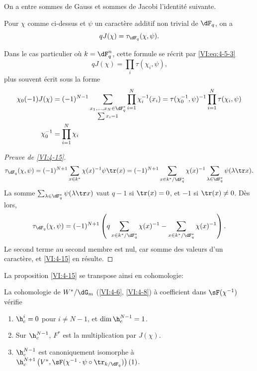 On a entre sommes de Gauss et sommes de Jacobi l'identité suivante. 





\begin{proposition_}\label{VI:4-15}
Pour $\chi$ comme ci-dessus et $\psi$ un caractère additif non trivial de 
$\dF_q$, on a 
\[
  q J(\chi) = \tau_{\dF_q}(\chi,\psi) \text{.} 
\]
\end{proposition_}

Dans le cas particulier où $k=\dF_q^n$, cette formule se récrit par 
\eqref{VI:eq:4-5-3} 
\begin{equation*}\tag{4.15.1}\label{VI:eq:4-15-1}
  q J(\chi) = \prod_i \tau(\chi_i,\psi) \text{,} 
\end{equation*}
plus souvent écrit sous la forme 
\begin{align*}
  \chi_0(-1) J(\chi) &= (-1)^{N-1} \sum_{\substack{x_1,\dots,x_N\in \dF_q^\ast \\ \sum x_i = 1}} \prod_{i=1}^N \chi_i^{-1}(x_i) = \tau(\chi_0^{-1},\psi)^{-1} \prod_{i=1}^N \tau(\chi_i,\psi) \\
  \chi_0^{-1} &= \prod_{i=1}^N \chi_i 
\end{align*}





\begin{proof}[Preuve de \ref{VI:4-15}]
\[
  \tau_{\dF_q}(\chi,\psi) = (-1)^{N+1} \sum_{x\in k^\ast} \chi(x)^{-1} \psi \tr(x) = (-1)^{N+1} \sum_{x\in k^\ast/\dF_q^\ast} \chi(x)^{-1} \sum_{\lambda\in \dF_q^\ast} \psi(\lambda \tr x) \text{.}
\]
La somme $\sum_{\lambda\in \dF_q^\ast} \psi(\lambda \tr x)$ vaut $q-1$ si 
$\tr(x)=0$, et $-1$ si $\tr(x)\ne 0$. Dès lors, 
\[
  \tau_{\dF_q}(\chi,\psi) = (-1)^{N+1} \left(q\sum_{x\in k^\ast/\dF_q^\ast} \chi(x)^{-1} - \sum_{x\in k^\ast/\dF_q^\ast} \chi(x)^{-1}\right) \text{.}
\]
Le second terme au second membre est nul, car somme des valeurs d'un 
caractère, et \ref{VI:4-15} en résulte. 
\end{proof}

La proposition \ref{VI:4-15} se transpose ainsi en cohomologie: 





\begin{proposition_}\label{VI:4-16}
La cohomologie de $W^\ast/\dG_m$ (\ref{VI:4-6}, \ref{VI:4-8}) à coefficient 
dans $\sF(\chi^{-1})$ vérifie 
\begin{enumerate}[\indent (i)]
  \item $\h_c^i=0$ pour $i\ne N-1$, et $\dim \h_c^{N-1}{}=1$. 
  \item Sur $\h_c^{N-1}$, $F^\ast$ est la multiplication par $J(\chi)$. 
  \item $\h_c^{N-1}$ est canoniquement isomorphe à 
    $\h_c^{N+1}\left(V^\ast,\sF(\chi^{-1}\cdot \psi\circ \tr_{k/\dF_q})\right)(1)$. 
\end{enumerate}
\end{proposition_}

